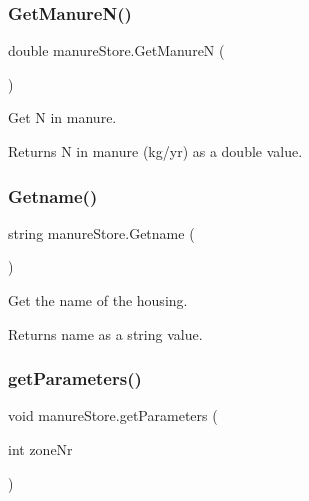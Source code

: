 \subsubsection{\texorpdfstring{GetManureN()}{GetManureN()}}
{\footnotesize\ttfamily double manure\+Store.\+Get\+ManureN (\begin{DoxyParamCaption}{ }\end{DoxyParamCaption})\hspace{0.3cm}{\ttfamily [inline]}}



Get N in manure. 

\begin{DoxyReturn}{Returns}
N in manure (kg/yr) as a double value. 
\end{DoxyReturn}
\mbox{\label{classmanure_store_a06d53dd5f1bd637c0f27c968ef63f8cf}} 
\subsubsection{\texorpdfstring{Getname()}{Getname()}}
{\footnotesize\ttfamily string manure\+Store.\+Getname (\begin{DoxyParamCaption}{ }\end{DoxyParamCaption})\hspace{0.3cm}{\ttfamily [inline]}}



Get the name of the housing. 

\begin{DoxyReturn}{Returns}
name as a string value. 
\end{DoxyReturn}
\mbox{\label{classmanure_store_acc4d7b113dd3294a798a4c57df282ccd}} 
\subsubsection{\texorpdfstring{getParameters()}{getParameters()}}
{\footnotesize\ttfamily void manure\+Store.\+get\+Parameters (\begin{DoxyParamCaption}\item[{int}]{zone\+Nr }\end{DoxyParamCaption})\hspace{0.3cm}{\ttfamily [inline]}}



